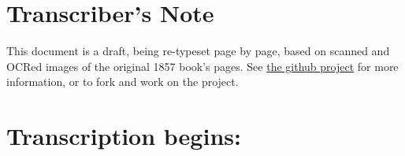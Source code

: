 \documentclass[9pt,a5paper]{memoir}
\begin{document}
\chapter*{Transcriber's Note}This document is a draft, being re-typeset page by page, based on scanned and OCRed images of the original 1857 book's pages. See \href{http://github.com/Vaguery/collegeJournalOfMedicalScienceSeptember1857}{the github project} for more information, or to fork and work on the project.
\chapter*{Transcription begins:}

















































\end{document}
